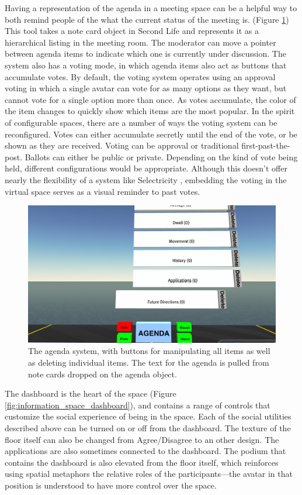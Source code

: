 Having a representation of the agenda in a meeting space can be a helpful way to both remind people of the what the current status of the meeting is. (Figure \ref{fig:information_space_agenda}) This tool takes a note card object in Second Life and represents it as a hierarchical listing in the meeting room. The moderator can move a pointer between agenda items to indicate which one is currently under discussion. The system also has a voting mode, in which agenda items also act as buttons that accumulate votes. By default, the voting system operates using an approval voting in which a single avatar can vote for as many options as they want, but cannot vote for a single option more than once. As votes accumulate, the color of the item changes to quickly show which items are the most popular. In the spirit of configurable spaces, there are a number of ways the voting system can be reconfigured. Votes can either accumulate secretly until the end of the vote, or be shown as they are received. Voting can be approval or traditional first-past-the-post. Ballots can either be public or private. Depending on the kind of vote being held, different configurations would be appropriate. Although this doesn't offer nearly the flexibility of a system like Selectricity \citep{Hill:2006vw}, embedding the voting in the virtual space serves as a visual reminder to past votes.
 


\begin{figure}[tp]
	\includegraphics{figures/agenda.png}
	\caption{The agenda system, with buttons for manipulating all items as well as deleting individual items. The text for the agenda is pulled from note cards dropped on the agenda object.}
	\label{fig:information_space_agenda}
\end{figure}


The dashboard is the heart of the space (Figure \ref{fig:information_space_dashboard}), and contains a range of controls that customize the social experience of being in the space. Each of the social utilities described above can be turned on or off from the dashboard. The texture of the floor itself can also be changed from Agree/Disagree to an other design. The applications are also sometimes connected to the dashboard. The podium that contains the dashboard is also elevated from the floor itself, which reinforces using spatial metaphors the relative roles of the participants---the avatar in that position is understood to have more control over the space.

